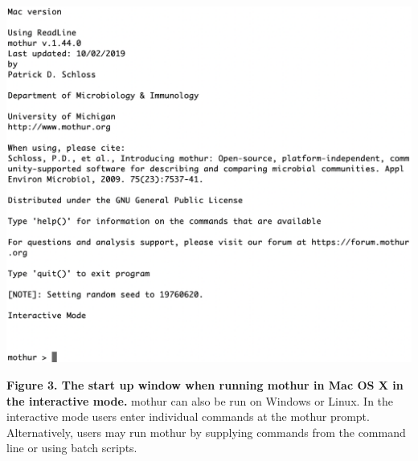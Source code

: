 \documentclass[11pt,]{article}
\begin{document}
\includegraphics{figure_3.png}

\textbf{Figure 3. The start up window when running mothur in Mac OS X in
the interactive mode.} mothur can also be run on Windows or Linux. In
the interactive mode users enter individual commands at the mothur
prompt. Alternatively, users may run mothur by supplying commands from
the command line or using batch scripts.
\end{document}
